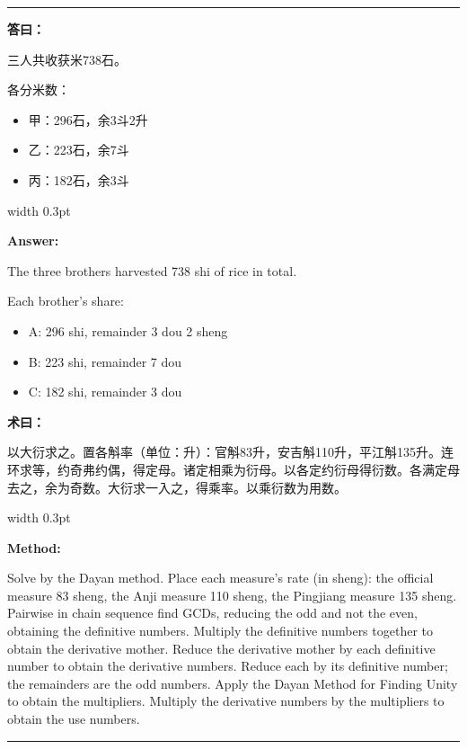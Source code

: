 \documentclass[10pt,a4paper]{article}
\newcommand{\cnlabel}[1]{\textcolor{labelcolor}{\textbf{#1}}}
\newcommand{\enlabel}[1]{\textcolor{labelcolor}{\textbf{#1}}}
\newenvironment{problemsection}{%
  \medskip\par\noindent\textcolor{rulecolor}{\rule{\textwidth}{0.4pt}}\par\smallskip%
}{\par\smallskip\noindent\textcolor{rulecolor}{\rule{\textwidth}{0.4pt}}\par\medskip}
\begin{document}
\begin{problemsection}
\noindent\begin{minipage}[t]{0.47\textwidth}
\begin{flushleft}
\small
\cnlabel{答曰：}

三人共收获米738石。

各分米数：
\begin{itemize}[leftmargin=*,nosep,topsep=2pt]
  \item 甲：296石，余3斗2升
  \item 乙：223石，余7斗
  \item 丙：182石，余3斗
\end{itemize}
\end{flushleft}
\end{minipage}%
\hfill\vrule width 0.3pt\hfill%
\begin{minipage}[t]{0.47\textwidth}
\begin{flushleft}
\small
\enlabel{Answer:}

The three brothers harvested 738 shi of rice in total.

Each brother's share:
\begin{itemize}[leftmargin=*,nosep,topsep=2pt]
  \item A: 296 shi, remainder 3 dou 2 sheng
  \item B: 223 shi, remainder 7 dou
  \item C: 182 shi, remainder 3 dou
\end{itemize}
\end{flushleft}
\end{minipage}

\vspace{0.3em}

\noindent\begin{minipage}[t]{0.47\textwidth}
\begin{flushleft}
\small
\cnlabel{术曰：}

以大衍求之。置各斛率（单位：升）：官斛83升，安吉斛110升，平江斛135升。连环求等，约奇弗约偶，得定母。诸定相乘为衍母。以各定约衍母得衍数。各满定母去之，余为奇数。大衍求一入之，得乘率。以乘衍数为用数。
\end{flushleft}
\end{minipage}%
\hfill\vrule width 0.3pt\hfill%
\begin{minipage}[t]{0.47\textwidth}
\begin{flushleft}
\small
\enlabel{Method:}

Solve by the Dayan method. Place each measure's rate (in sheng): the official measure 83 sheng, the Anji measure 110 sheng, the Pingjiang measure 135 sheng. Pairwise in chain sequence find GCDs, reducing the odd and not the even, obtaining the definitive numbers. Multiply the definitive numbers together to obtain the derivative mother. Reduce the derivative mother by each definitive number to obtain the derivative numbers. Reduce each by its definitive number; the remainders are the odd numbers. Apply the Dayan Method for Finding Unity to obtain the multipliers. Multiply the derivative numbers by the multipliers to obtain the use numbers.
\end{flushleft}
\end{minipage}

\end{problemsection}
\end{document}
